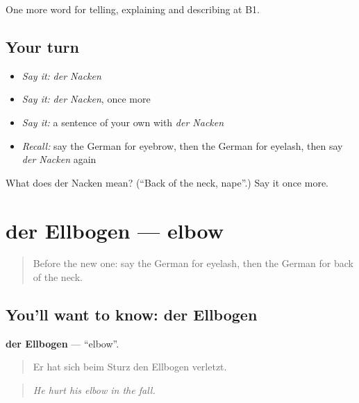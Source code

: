 \begin{grammarlens}[title={What you've built}]
One more word for telling, explaining and describing at B1.
\end{grammarlens}

\subsection*{Your turn}
\begin{itemize}
\raggedright
  \item \emph{Say it:} \emph{der Nacken}
  \item \emph{Say it:} \emph{der Nacken}, once more
  \item \emph{Say it:} a sentence of your own with \emph{der Nacken}
  \item \emph{Recall:} say the German for eyebrow, then the German for eyelash, then say \emph{der Nacken} again
\end{itemize}

\begin{tcolorbox}[breakable,colback=teal!4,colframe=teal!35!black,title={Before you move on}]
What does der Nacken mean? (\textquotedblleft{}Back of the neck, nape\textquotedblright{}.) Say it once more.
\end{tcolorbox}
\section[der Ellbogen]{der Ellbogen — elbow}

\label{lesson:GE-C485-ellbogen}



\begin{quote}
Before the new one: say the German for eyelash, then the German for back of the neck.
\end{quote}

\subsection*{You'll want to know: der Ellbogen}
\textbf{der Ellbogen} — \textquotedblleft{}elbow\textquotedblright{}.

\begin{quote}
Er hat sich beim Sturz den Ellbogen verletzt.
\end{quote}

\begin{quote}
\emph{He hurt his elbow in the fall.}
\end{quote}

